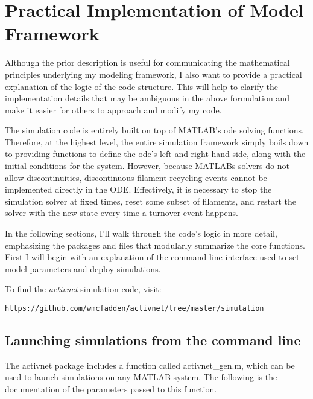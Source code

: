 

\section{Practical Implementation of Model Framework}

Although the prior description is useful for communicating the mathematical principles underlying my modeling framework, I also want to provide a practical explanation of the logic of the code structure.  This will help to clarify the implementation details that may be ambiguous in the above formulation and make it easier for others to approach and modify my code.

The simulation code is entirely built on top of MATLAB's ode solving functions.  Therefore, at the highest level, the entire simulation framework simply boils down to providing functions to define the ode's left and right hand side, along with the initial conditions for the system.  However, because MATLABs solvers do not allow discontinuities, discontinuous filament recycling events cannot be implemented directly in the ODE.  Effectively, it is necessary to stop the simulation solver at fixed times, reset some subset of filaments, and restart the solver with the new state every time a turnover event happens.


In the following sections, I'll walk through the code's logic in more detail, emphasizing the packages and files that modularly summarize the core functions.  First I will begin with an explanation of the command line interface used to set model parameters and deploy simulations.

To find the \textit{activnet} simulation code, visit:
\begin{verbatim}
https://github.com/wmcfadden/activnet/tree/master/simulation
\end{verbatim}

\subsection{Launching simulations from the command line}



The activnet package includes a function called activnet\_gen.m, which can be used to launch simulations on any MATLAB system.  The following is the documentation of the parameters passed to this function.

